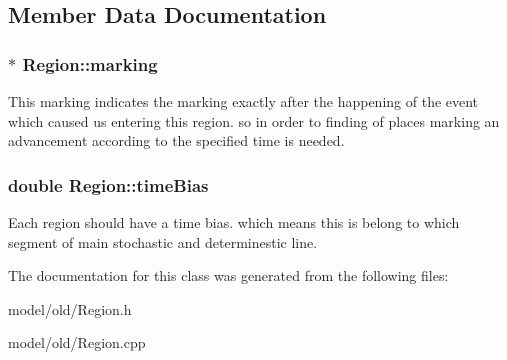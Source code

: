 \subsection{Member Data Documentation}
\hypertarget{classRegion_aed4910285f30a87eefaf58fd2c96c4e6}{
\subsubsection[{marking}]{$\ast$ Region\-::marking}}\label{classRegion_aed4910285f30a87eefaf58fd2c96c4e6}
This marking indicates the marking exactly after the happening of the event which caused us entering this region. so in order to finding of places marking an advancement according to the specified time is needed. \hypertarget{classRegion_af080e4f60bc8a0231ee52d96f69f40e3}{
\subsubsection[{time\-Bias}]{\setlength{\rightskip}{0pt plus 5cm}double Region\-::time\-Bias}}\label{classRegion_af080e4f60bc8a0231ee52d96f69f40e3}
Each region should have a time bias. which means this is belong to which segment of main stochastic and determinestic line. 

The documentation for this class was generated from the following files\-:\begin{DoxyCompactItemize}
\item 
model/old/Region.\-h\item 
model/old/Region.\-cpp\end{DoxyCompactItemize}
